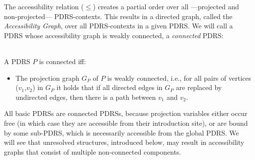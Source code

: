 
The accessibility relation ($\leq$) creates a partial order over all
---projected and non-projected--- PDRS-contexts. This results in a directed
graph, called the \textit{Accessibility Graph}, over all PDRS-contexts in
a given PDRS. We will call a PDRS whose accessibility graph is weakly
connected, a \emph{connected} PDRS:

\begin{definition}[Connectedness]~\\
  A PDRS $P$ is connected iff:
  \begin{itemize}
    \item The projection graph $G_P$ of $P$ is weakly connected, i.e., for
      all pairs of vertices ($v_1$,$v_2$) in $G_P$ it holds that if all
      directed edges in $G_P$ are replaced by undirected edges, then there is
      a path between $v_1$ and $v_2$.  
  \end{itemize}
\end{definition}

\noindent All basic PDRSs are connected PDRSs, because projection variables
either occur free (in which case they are accessible from their introduction
site), or are bound by some sub-PDRS, which is necessarily accessible from
the global PDRS. We will see that unresolved structures, introduced below,
may result in accessibility graphs that consist of multiple non-connected
components.


